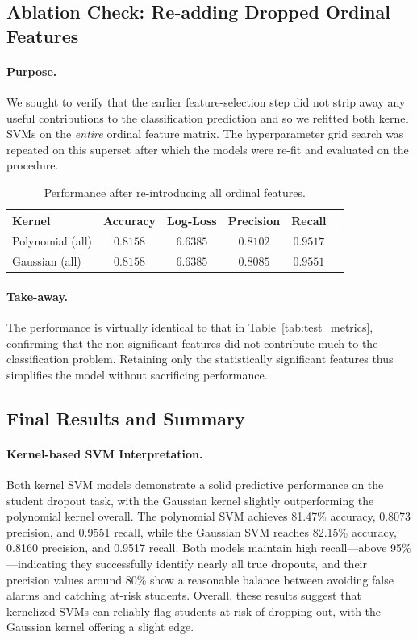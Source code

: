 \documentclass[12pt]{article}
\begin{document}
\subsection{Ablation Check: Re-adding Dropped Ordinal Features}

\paragraph{Purpose.}
We sought to verify that the earlier feature-selection step did not strip away any useful contributions to the classification prediction and so we refitted both kernel SVMs on the \emph{entire} ordinal feature matrix. The hyperparameter grid search was repeated on this superset after which the models were re-fit and evaluated on the procedure.

\begin{table}[H]
\centering
\begin{tabular}{lccccc}
\toprule
Kernel & Accuracy & Log-Loss & Precision & Recall\\ \midrule
Polynomial (all) & $0.8158$ & $6.6385$ & $0.8102$ & $0.9517$ \\
Gaussian (all)   & $0.8158$ & $6.6385$ & $0.8085$ & $0.9551$ \\ 
\bottomrule
\end{tabular}
\caption{Performance after re-introducing all ordinal features.}
\label{tab:full_feats}
\end{table}

\paragraph{Take-away.}
The performance is virtually identical to that in Table~\ref{tab:test_metrics}, confirming that the non-significant features did not contribute much to the classification problem. Retaining only the statistically significant features thus simplifies the model without sacrificing performance.

\subsection{Final Results and Summary}

\paragraph{Kernel-based SVM Interpretation.}  
Both kernel SVM models demonstrate a solid predictive performance on the student dropout task, with the Gaussian kernel slightly outperforming the polynomial kernel overall. The polynomial SVM achieves 81.47\% accuracy, 0.8073 precision, and 0.9551 recall, while the Gaussian SVM reaches 82.15\% accuracy, 0.8160 precision, and 0.9517 recall. Both models maintain high recall—above 95\%—indicating they successfully identify nearly all true dropouts, and their precision values around 80\% show a reasonable balance between avoiding false alarms and catching at-risk students. Overall, these results suggest that kernelized SVMs can reliably flag students at risk of dropping out, with the Gaussian kernel offering a slight edge.
\end{document}
